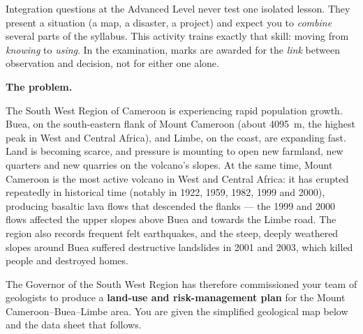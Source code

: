 \documentclass[11pt]{article}
\newcounter{popsec}
\newcounter{popsub}
\newcommand{\courssub}[1]{%
  \stepcounter{popsub}%
  \par\vspace{9pt}\noindent{\popxbold\fontsize{11.5}{13}\selectfont\color{popink}{\color{poporange}\thepopsec.\thepopsub}\hspace{6pt}#1}\par\nopagebreak\vspace{4pt}
}
\begin{document}
\begin{attention}
Integration questions at the Advanced Level never test one isolated lesson. They present a situation (a map, a disaster, a project) and expect you to \emph{combine} several parts of the syllabus. This activity trains exactly that skill: moving from \emph{knowing} to \emph{using}. In the examination, marks are awarded for the \emph{link} between observation and decision, not for either one alone.
\end{attention}

\courssub{Situation}

\textbf{The problem.}\par
The South West Region of Cameroon is experiencing rapid population growth. Buea, on the south-eastern flank of Mount Cameroon (about \SI{4095}{m}, the highest peak in West and Central Africa), and Limbe, on the coast, are expanding fast. Land is becoming scarce, and pressure is mounting to open new farmland, new quarters and new quarries on the volcano's slopes. At the same time, Mount Cameroon is the most active volcano in West and Central Africa: it has erupted repeatedly in historical time (notably in 1922, 1959, 1982, 1999 and 2000), producing basaltic lava flows that descended the flanks — the 1999 and 2000 flows affected the upper slopes above Buea and towards the Limbe road. The region also records frequent felt earthquakes, and the steep, deeply weathered slopes around Buea suffered destructive landslides in 2001 and 2003, which killed people and destroyed homes.

The Governor of the South West Region has therefore commissioned your team of geologists to produce a \textbf{land-use and risk-management plan} for the Mount Cameroon--Buea--Limbe area. You are given the simplified geological map below and the data sheet that follows.
\end{document}
